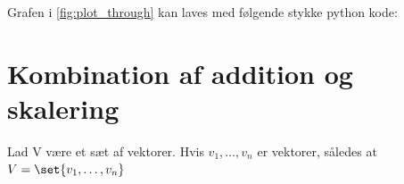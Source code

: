 Grafen i \cref{fig:plot_through} kan laves med følgende stykke python kode:


\section{Kombination af addition og skalering}


\begin{frdef}
	Lad V være et sæt af vektorer.
Hvis $v_1,\dots,v_n$ er vektorer, således at $V=\set{v_1,\dots,v_n}$
\end{frdef}